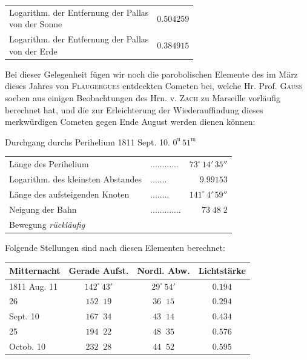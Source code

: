 \begin{center}\fontsize{10}{12}\selectfont\setlength{\tabcolsep}{4pt}\renewcommand{\arraystretch}{1.15}\begin{tabular}{lr}
\shortstack[l]{Logarithm. der Entfernung der Pallas\\von der Sonne} & $0.504259$\\
\shortstack[l]{Logarithm. der Entfernung der Pallas\\von der Erde} & $0.384915$\\
\end{tabular}\end{center}

\par\indent Bei dieser Gelegenheit fügen wir noch die parobolischen  Elemente des im März dieses Jahres von \textsc{Flaugergues} entdeckten Cometen bei, welche Hr. Prof. \textsc{Gauss} soeben aus einigen Beobachtungen des Hrn. v. \textsc{Zach} zu Marseille vorläufig berechnet hat, und die zur Erleichterung der Wiederauffindung dieses merkwürdigen Cometen gegen Ende August werden dienen können:
\begin{center}Durchgang durchs Perihelium 1811 Sept. 10. $0^{\mathrm u}\,51^{\mathrm m}$\end{center}

\begin{center}\fontsize{10}{12}\selectfont\setlength{\tabcolsep}{4pt}\renewcommand{\arraystretch}{1.15}\begin{tabular}{llr}
Länge des Perihelium & .\;.\;.\;.\;.\;.\;.\;.\;.\;.\;.\;. & $73^\circ\,14'\,35''$\\
Logarithm. des kleinsten Abstandes & .\;.\;.\;.\;.\;.\;. & $9.99153$\\
Länge des aufsteigenden Knoten & .\;.\;.\;.\;.\;.\;.\;. & $141^\circ\,4'\,59''$\\
Neigung der Bahn & .\;.\;.\;.\;.\;.\;.\;.\;.\;.\;.\;.\;. & $73\;48\;2$\\
Bewegung \emph{rückläufig} &  & \\
\end{tabular}\end{center}

\par\indent Folgende Stellungen sind nach diesen Elementen berechnet:
\begin{center}\fontsize{10}{12}\selectfont\setlength{\tabcolsep}{4pt}\renewcommand{\arraystretch}{1.15}
\begin{tabular}{l|cc|c}
Mitternacht & Gerade Aufst. & Nordl. Abw. & Lichtstärke \\
\hline
1811 Aug. 11 & $142^\circ\,43'$ & $29^\circ\,54'$ & $0.194$ \\
\phantom{1811 }\phantom{Aug. }26 & $152\;\;19$ & $36\;\;15$ & $0.294$ \\
Sept. 10 & $167\;\;34$ & $43\;\;14$ & $0.434$ \\
\phantom{Sept. }25 & $194\;\;22$ & $48\;\;35$ & $0.576$ \\
Octob. 10 & $232\;\;28$ & $44\;\;52$ & $0.595$ \\
\end{tabular}
\end{center}



